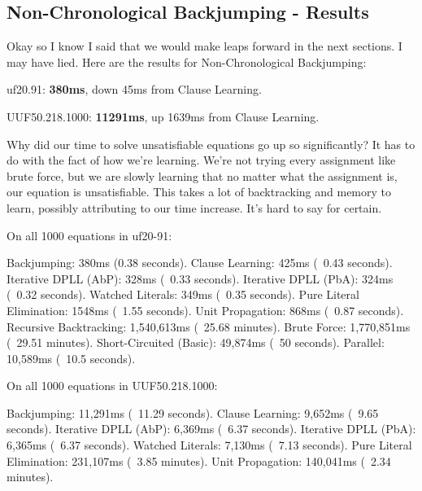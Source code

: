 \subsection{Non-Chronological Backjumping - Results}
Okay so I know I said that we would make leaps forward in the next sections.
I may have lied. Here are the results for Non-Chronological Backjumping:

\noindent
uf20.91: \textbf{380ms}, down 45ms from Clause Learning.

\noindent
UUF50.218.1000: \textbf{11291ms}, up 1639ms from Clause Learning.

Why did our time to solve unsatisfiable equations go up so significantly? It has to do 
with the fact of how we're learning. We're not trying every assignment like brute force, but 
we are slowly learning that no matter what the assignment is, our equation is unsatisfiable. 
This takes a lot of backtracking and memory to learn, possibly attributing to our time increase.
It's hard to say for certain.

\begin{FVerbatim}
On all 1000 equations in uf20-91:

Backjumping:               380ms (0.38 seconds).
Clause Learning:           425ms (~0.43 seconds).
Iterative DPLL (AbP):      328ms (~0.33 seconds).
Iterative DPLL (PbA):      324ms (~0.32 seconds).
Watched Literals:          349ms (~0.35 seconds).
Pure Literal Elimination:  1548ms (~1.55 seconds).
Unit Propagation:          868ms (~0.87 seconds).
Recursive Backtracking:    1,540,613ms (~25.68 minutes).
Brute Force:               1,770,851ms (~29.51 minutes).
Short-Circuited (Basic):   49,874ms (~50 seconds).
Parallel:                  10,589ms (~10.5 seconds).

On all 1000 equations in UUF50.218.1000:

Backjumping:              11,291ms (~11.29 seconds).
Clause Learning:          9,652ms (~9.65 seconds).
Iterative DPLL (AbP):     6,369ms (~6.37 seconds).
Iterative DPLL (PbA):     6,365ms (~6.37 seconds).
Watched Literals:         7,130ms (~7.13 seconds).
Pure Literal Elimination: 231,107ms (~3.85 minutes).
Unit Propagation:         140,041ms (~2.34 minutes).
\end{FVerbatim}
